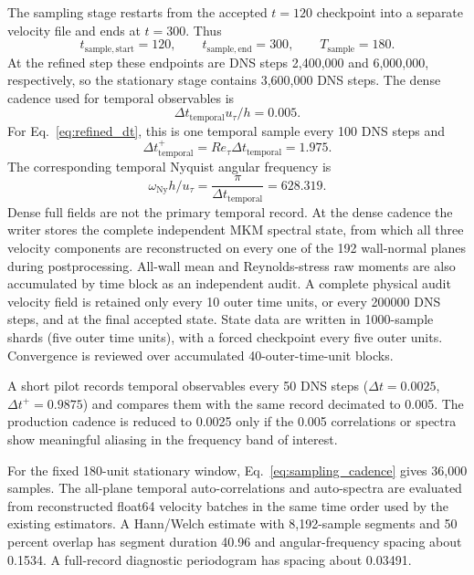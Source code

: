 \documentclass[11pt]{article}
\begin{document}
The sampling stage restarts from the accepted $t=120$ checkpoint into a
separate velocity file and ends at $t=300$.  Thus
\begin{equation}
  t_{\mathrm{sample,start}}=120,\qquad
  t_{\mathrm{sample,end}}=300,\qquad
  T_{\mathrm{sample}}=180.
  \label{eq:sampling_window}
\end{equation}
At the refined step these endpoints are DNS steps 2,400,000 and 6,000,000,
respectively, so the stationary stage contains 3,600,000 DNS steps.
The dense cadence used for temporal observables is
\begin{equation}
  \boxed{\Delta t_{\mathrm{temporal}}u_{\tau}/h=0.005}.
  \label{eq:sampling_cadence}
\end{equation}
For Eq.~\eqref{eq:refined_dt}, this is one temporal sample every 100 DNS steps
and
\begin{equation}
  \Delta t_{\mathrm{temporal}}^+
  =Re_{\tau}\Delta t_{\mathrm{temporal}}=1.975.
  \label{eq:sampling_wall_time}
\end{equation}
The corresponding temporal Nyquist angular frequency is
\begin{equation}
  \omega_{\mathrm{Ny}}h/u_{\tau}
  =\frac{\pi}{\Delta t_{\mathrm{temporal}}}=628.319.
  \label{eq:sampling_nyquist}
\end{equation}
Dense full fields are not the primary temporal record.  At the dense cadence
the writer stores the complete independent MKM spectral state, from which all
three velocity components are reconstructed on every one of the 192
wall-normal planes during postprocessing.  All-wall mean and Reynolds-stress
raw moments are also accumulated by time block as an independent audit.  A
complete physical audit velocity field is retained only every 10 outer time
units, or every 200000 DNS steps, and at the final accepted state.  State data
are written in 1000-sample shards (five outer time units), with a forced
checkpoint every five outer units.  Convergence is reviewed over accumulated
40-outer-time-unit blocks.

A short pilot records temporal observables every 50 DNS steps
($\Delta t=0.0025$, $\Delta t^+=0.9875$) and compares them with the same
record decimated to 0.005.  The production cadence is reduced to 0.0025 only
if the 0.005 correlations or spectra show meaningful aliasing in the frequency
band of interest.

For the fixed 180-unit stationary window,
Eq.~\eqref{eq:sampling_cadence} gives 36,000 samples.  The
all-plane temporal auto-correlations and auto-spectra are evaluated from
reconstructed float64 velocity batches in the same time order used by the
existing estimators.  A Hann/Welch estimate with 8,192-sample segments and 50
percent overlap has segment duration 40.96 and angular-frequency spacing about
0.1534.  A full-record diagnostic periodogram has spacing about 0.03491.
\end{document}
